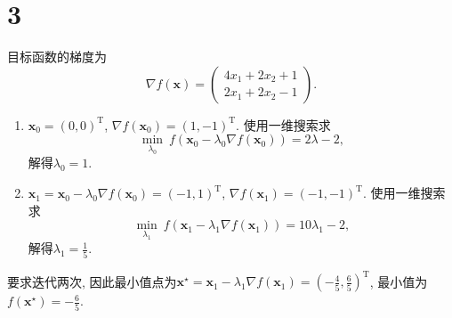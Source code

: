 \section*{3}

目标函数的梯度为
\begin{equation*}
    \nabla f(\bm{x})=
    \begin{pmatrix}
        4 x_{1} + 2 x_{2} + 1 \\
        2 x_{1} + 2 x_{2} - 1
    \end{pmatrix}.
\end{equation*}

\begin{enumerate}
    \item
        $\bm{x}_0=(0,0)^\mathrm{T}$, $\nabla f(\bm{x}_0)=(1,-1)^\mathrm{T}$.
        使用一维搜索求
        \begin{equation*}
            \min_{\lambda_0} ~ f\left(\bm{x}_0-\lambda_0\nabla f(\bm{x}_0)\right)=2\lambda-2,
        \end{equation*}
        解得$\lambda_0=1$.

    \item
        $\bm{x}_1=\bm{x}_0-\lambda_0\nabla f(\bm{x}_0)=(-1,1)^\mathrm{T}$, $\nabla f(\bm{x}_1)=(-1,-1)^\mathrm{T}$.
        使用一维搜索求
        \begin{equation*}
            \min_{\lambda_1} ~ f\left(\bm{x}_1-\lambda_1\nabla f(\bm{x}_1)\right)=10\lambda_1-2,
        \end{equation*}
        解得$\lambda_1=\frac{1}{5}$.
\end{enumerate}

要求迭代两次, 因此最小值点为$\bm{x}^\star=\bm{x}_1-\lambda_1\nabla f(\bm{x}_1)=\left(-\frac{4}{5},\frac{6}{5}\right)^\mathrm{T}$, 最小值为$f(\bm{x}^\star)=-\frac{6}{5}$.

